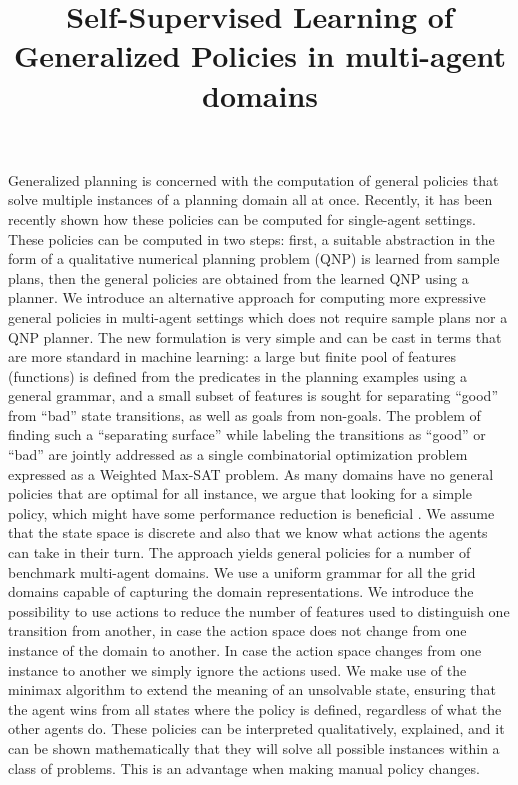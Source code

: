 \documentclass[a4paper]{article}
\title{Self-Supervised Learning of Generalized Policies in multi-agent domains}
\begin{document}
\maketitle


\abstract

Generalized planning is concerned with the computation of general policies that solve multiple instances of a planning domain all at once. Recently, it has been recently shown how these policies can be computed for single-agent settings. These policies can be computed in two steps: first, a suitable abstraction in the form of a qualitative numerical planning problem (QNP) is learned from sample plans, then the general policies are obtained from the learned QNP using a planner. We introduce an alternative approach for computing more expressive general policies in multi-agent settings which does not require sample plans nor a QNP planner. The new formulation is very simple and can be cast in terms that are more standard in machine learning: a large but finite pool of features (functions) is defined from the predicates in the planning examples using a general grammar, and a small subset of features is sought for separating “good” from “bad” state transitions, as well as goals from non-goals. The problem of finding such a ``separating surface'' while labeling the transitions as ``good'' or ``bad'' are jointly addressed as a single combinatorial optimization problem expressed as a Weighted Max-SAT problem. As many domains have no general policies that are optimal for all instance, we argue that looking for a simple policy, which might have some performance reduction  is beneficial . We assume that the state space is discrete and also that we know what actions the agents can take in their turn. The approach yields general policies for a number of benchmark multi-agent domains. We use a uniform grammar for all the grid domains capable of capturing the domain representations. We introduce the possibility to use actions to reduce the number of features used to distinguish one transition from another, in case the action space does not change from one instance of the domain to another. In case the action space changes from one instance to another we simply ignore the actions used. We make use of the minimax algorithm to extend the meaning of an unsolvable state, ensuring that the agent wins from all states where the policy is defined, regardless of what the other agents do. These policies can be interpreted qualitatively, explained, and it can be shown mathematically that they will solve all possible instances within a class of problems. This is an advantage when making manual policy changes.
\end{document}
